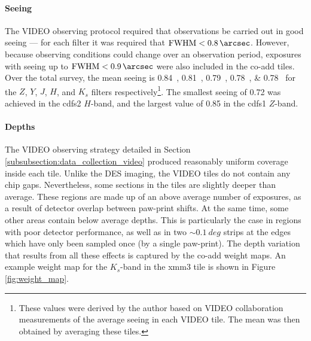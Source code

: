 \paragraph{Seeing} The VIDEO observing protocol required that observations be carried out in good seeing --- for each filter it was required that $\mathrm{FWHM} < \SI{0.8}{\arcsec}$. However, because observing conditions could change over an observation period, exposures with seeing up to $\mathrm{FWHM} < \SI{0.9}{\arcsec}$ were also included in the co-add tiles. Over the total survey, the mean seeing is \SIlist[list-units = brackets]{0.84; 0.81; 0.79; 0.78; 0.78}{\arcsec} for the $Z$, $Y$, $J$, $H$, and $K_{s}$ filters respectively\footnote{These values were derived by the author based on VIDEO collaboration measurements of the average seeing in each VIDEO tile. The mean was then obtained by averaging these tiles.}.  The smallest seeing of \SI{0.72}{\arcsec} was achieved in the cdfs2 $H$-band, and the largest value of \SI{0.85}{\arcsec} in the cdfs1 $Z$-band.  \par


\paragraph{Depths} The VIDEO observing strategy detailed in Section \ref{subsubsection:data_collection_video} produced reasonably uniform coverage inside each tile. Unlike the DES imaging, the VIDEO tiles do not contain any chip gaps. Nevertheless, some sections in the tiles are slightly deeper than average. These regions are made up of an above average number of exposures, as a result of detector overlap between paw-print shifts. At the same time, some other areas contain below average depths. This is particularly the case in regions with poor detector performance, as well as in two $\sim \SI{0.1}{deg}$ strips at the edges which have only been sampled once (by a single paw-print). The depth variation that results from all these effects is captured by the co-add weight maps. An example weight map for the $K_{s}$-band in the xmm3 tile is shown in Figure \ref{fig:weight_map}.  \par


